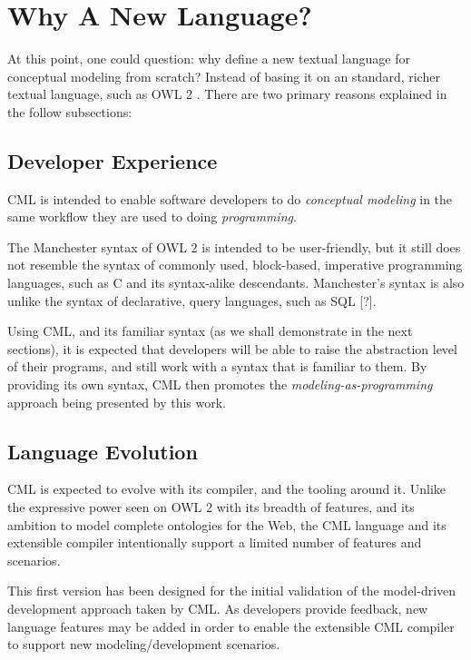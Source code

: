 \section{Why A New Language?}\label{sec:why}

At this point, one could question: why define a new textual language for conceptual modeling from scratch? Instead of basing it on an standard, richer textual language, such as OWL 2 \cite{owl2}. There are two primary reasons explained in the follow subsections:

\subsection{Developer Experience}

CML is intended to enable software developers to do \emph{conceptual modeling} in the same workflow they are used to doing \emph{programming}.

The Manchester \cite{owl2manchester} syntax of OWL 2 is intended to be user-friendly,
but it still does not resemble the syntax of commonly used, block-based, imperative programming languages,
such as C \cite{clang} and its syntax-alike descendants.
Manchester's syntax is also unlike the syntax of declarative, query languages, such as SQL [?].

Using CML,
and its familiar syntax (as we shall demonstrate in the next sections),
it is expected that developers will be able to raise the abstraction level of their programs,
and still work with a syntax that is familiar to them.
By providing its own syntax,
CML then promotes the \emph{modeling-as-programming} approach being presented by this work. 

\subsection{Language Evolution}

CML is expected to evolve with its compiler, and the tooling around it.
Unlike the expressive power seen on OWL 2 \cite{owl2} with its breadth of features,
and its ambition to model complete ontologies for the Web,
the CML language and its extensible compiler intentionally support a limited number of features and scenarios.

This first version has been designed for the initial validation of the model-driven development approach taken by CML.
As developers provide feedback,
new language features may be added in order to enable the extensible CML compiler to support new modeling/development scenarios.

